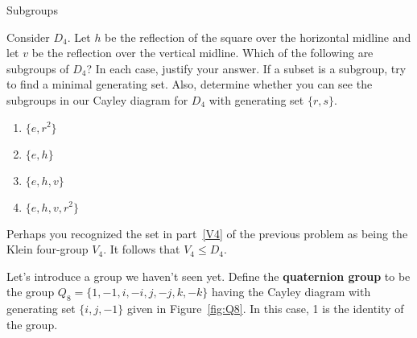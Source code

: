 \begin{section}{Subgroups}
\begin{problem}\label{prob:subgroups_D4}
Consider $D_4$.  Let $h$ be the reflection of the square over the horizontal midline and let $v$ be the reflection over the vertical midline.  Which of the following are subgroups of $D_4$?  In each case, justify your answer.  If a subset is a subgroup, try to find a minimal generating set.  Also, determine whether you can see the subgroups in our Cayley diagram for $D_4$ with generating set $\{r,s\}$.
\begin{enumerate}[label=\textrm{(\alph*)}]
\item $\{e, r^2\}$
\item $\{e,h\}$
\item $\{e, h, v\}$
\item\label{V4} $\{e, h, v, r^2\}$
\end{enumerate}
\end{problem}

Perhaps you recognized the set in part~\ref{V4} of the previous problem as being the Klein four-group $V_4$. It follows that $V_4\leq D_4$.

Let's introduce a group we haven't seen yet.  Define the \textbf{quaternion group} to be the group $Q_8=\{1,-1,i,-i,j,-j,k,-k\}$ having the Cayley diagram with generating set $\{i, j, -1\}$ given in Figure~\ref{fig:Q8}.  In this case, 1 is the identity of the group.

\begin{figure}[!ht]
\centering
{}
\end{figure}
\end{section}
